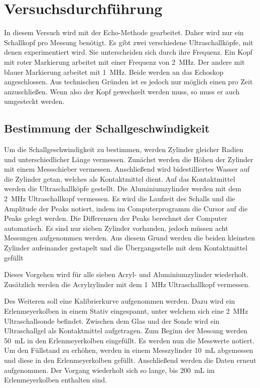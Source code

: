 %

%
\section{Versuchsdurchführung}

In diesem Versuch wird mit der Echo-Methode gearbeitet. Daher wird nur ein Schallkopf pro Messung benötigt.
Es gibt zwei verschiedene Ultraschallköpfe, mit denen experimentiert wird. Sie unterscheiden sich durch 
ihre Frequenz. Ein Kopf mit roter Markierung arbeitet mit einer Frequenz von \qty{2}{\mega \hertz}. Der 
andere mit blauer Markierung arbeitet mit \qty{1}{\mega \hertz}. Beide werden an das Echoskop angeschlossen.
Aus technischen Gründen ist es jedoch nur möglich einen pro Zeit anzuschließen. Wenn also der Kopf gewechselt 
werden muss, so muss er auch umgesteckt werden.

\subsection{Bestimmung der Schallgeschwindigkeit}

\noindent Um die Schallgeschwindigkeit zu bestimmen, werden Zylinder gleicher Radien und unterschiedlicher 
Länge vermessen. Zunächst werden die Höhen der Zylinder mit einem Messschieber vermessen.
Anschließend wird bidestilliertes Wasser auf die Zylinder getan, welches als Kontaktmittel dient. 
Auf das Kontaktmittel werden die Ultraschallköpfe gestellt. 
Die Aluminiumzylinder werden mit dem \qty{2}{\mega \hertz} Ultraschallkopf vermessen. Es wird die Laufzeit 
des Schalls und die Amplitude der Peaks notiert, indem im Computerprogramm die Cursor auf die Peaks gelegt werden.
Die Differenzen der Peaks berechnet der Computer automatisch.   
Es sind nur sieben Zylinder vorhanden, jedoch müssen acht Messungen aufgenommen werden. Aus diesem Grund werden 
die beiden kleinsten Zylinder aufeinander gestapelt und die Übergangsstelle mit dem Kontaktmittel gefüllt

\noindent Dieses Vorgehen wird für alle sieben Acryl- und Aluminiumzylinder wiederholt. Zusätzlich werden die Acrylzylinder 
mit dem \qty{1}{\mega \hertz} Ultraschallkopf vermessen.

\noindent Des Weiteren soll eine Kalibrierkurve aufgenommen werden. Dazu wird ein Erlenmeyerkolben in einem Stativ eingespannt,
unter welchem sich eine \qty{2}{\mega \hertz} Ultraschallsonde befindet. Zwischen dem Glas und der Sonde wird ein 
Ultraschallgel als Kontaktmittel aufgetragen. Zum Beginn der Messung werden \qty{50}{\milli \liter} in den 
Erlenmeyerkolben eingefüllt. Es werden nun die Messwerte notiert. Um den Füllstand zu erhöhen, werden in einem 
Messzylinder \qty{10}{\milli \liter} abgemessen und diese in den Erlenmeyerkolben gefüllt. Anschließend werden die 
Daten erneut aufgenommen. Der Vorgang wiederholt sich so lange, bis \qty{200}{\milli \liter} im Erlenmeyerkolben 
enthalten sind. 


